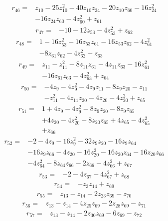 \begin{align*}
r_{46}={}&z_{10} -25z_{10}^{2} -40z_{10}z_{24} -20z_{10}z_{60} -16z_{24}^{2}\\
&-16z_{24}z_{60} -4z_{60}^{2} +z_{61}
\end{align*}
\begin{align*}
r_{47}={}&-10 -12z_{53} -4z_{53}^{2} +z_{62}
\end{align*}
\begin{align*}
r_{48}={}&1 -16z_{53}^{2} -16z_{53}z_{61} -16z_{53}z_{62} -4z_{61}^{2}\\
&-8z_{61}z_{62} -4z_{62}^{2} +z_{63}
\end{align*}
\begin{align*}
r_{49}={}&z_{11} -z_{11}^{2} -8z_{11}z_{61} -4z_{11}z_{63} -16z_{61}^{2}\\
&-16z_{61}z_{63} -4z_{63}^{2} +z_{64}
\end{align*}
\begin{align*}
r_{50}={}&-4z_{9} -4z_{9}^{2} -4z_{9}z_{11} -8z_{9}z_{20} -z_{11}\\
&-z_{11}^{2} -4z_{11}z_{20} -4z_{20} -4z_{20}^{2} +z_{65}
\end{align*}
\begin{align*}
r_{51}={}&1 +4z_{9} -4z_{9}^{2} -8z_{9}z_{20} -8z_{9}z_{65}\\
&+4z_{20} -4z_{20}^{2} -8z_{20}z_{65} +4z_{65} -4z_{65}^{2}\\
&+z_{66}
\end{align*}
\begin{align*}
r_{52}={}&-2 -4z_{9} -16z_{9}^{2} -32z_{9}z_{20} -16z_{9}z_{64}\\
&-16z_{9}z_{66} -4z_{20} -16z_{20}^{2} -16z_{20}z_{64} -16z_{20}z_{66}\\
&-4z_{64}^{2} -8z_{64}z_{66} -2z_{66} -4z_{66}^{2} +z_{67}
\end{align*}
\begin{align*}
r_{53}={}&-2 -4z_{67} -4z_{67}^{2} +z_{68}
\end{align*}
\begin{align*}
r_{54}={}&-z_{3}z_{14} +z_{69}
\end{align*}
\begin{align*}
r_{55}={}&z_{13} -z_{14} -2z_{23}z_{69} -z_{70}
\end{align*}
\begin{align*}
r_{56}={}&z_{13} -z_{14} -4z_{25}z_{69} -2z_{28}z_{69} -z_{71}
\end{align*}
\begin{align*}
r_{57}={}&z_{13} -z_{14} -2z_{30}z_{69} -6z_{69} -z_{72}
\end{align*}
